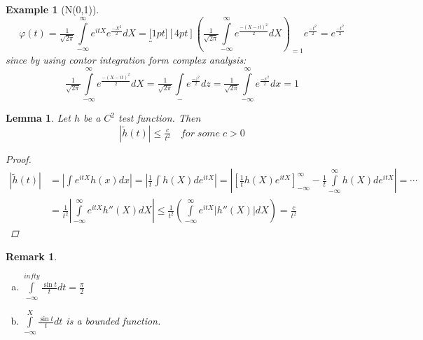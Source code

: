 \documentclass[12pt]{article}
\newtheorem{lemma}[theorem]{Lemma}
\newtheorem{example}{Example}[section]
\newtheorem*{remark}{Remark}
\begin{document}
\begin{example}[N(0,1)]
\[\varphi(t) = \tfrac{1}{\sqrt{2\pi}}\int\limits_{-\infty}^{\infty}e^{itX}e^{\tfrac{-X^2}{2}}dX = \underbracket[1pt][4pt]{\left(\tfrac{1}{\sqrt{2\pi}}\int\limits_{-\infty}^{\infty}e^{\frac{-(X-it)^2}{2}}dX\right)}_{=1}e^{\frac{-t^2}{2}} = e^{\frac{-t^2}{2}}\]
since by using contor integration form complex analysis:
\[\tfrac{1}{\sqrt{2\pi}}\int\limits_{-\infty}^{\infty}e^{\frac{-(X-it)^2}{2}}dX = \tfrac{1}{\sqrt{2\pi}}\int\limits_{-}e^{\frac{-z^2}{2}}dz = \tfrac{1}{\sqrt{2\pi}}\int\limits_{-\infty}^{\infty}e^{\frac{-x^2}{2}}dx =1\]
\end{example}

\begin{lemma}
Let $h$ be a $C^2$ test function. Then
\[|\tilde{h}(t)| \leq \tfrac{c}{t^2} \quad for\; some\; c>0\]
\begin{proof}
\begin{align*}
|\tilde{h}(t)| &= \left|\int e^{itX}h(x)dx \right| = \left|\tfrac{1}{t}\int h(X)de^{itX}\right| = \left|\left[\tfrac{1}{t} h(X)e^{itX}\right]_{-\infty}^{\infty} - \tfrac{1}{t}\int\limits_{-\infty}^{\infty} h(X)de^{itX}\right|= \cdots \\ 
&=\tfrac{1}{t^2}\left|\int\limits_{-\infty}^{\infty}e^{itX} h''(X)dX\right| \leq  \tfrac{1}{t^2}\left(\int\limits_{-\infty}^{\infty}e^{itX}\left| h''(X)\right|dX\right) = \frac{c}{t^2} \end{align*}
\end{proof}
\end{lemma}

\begin{remark}\quad \\
\begin{enumerate}[(a)]
\item $\int\limits_{-\infty}^{infty} \frac{\sin t}{t} dt = \tfrac{\pi}{2}$
\item $\int\limits_{-\infty}^{X} \frac{\sin t}{t} dt$ is a bounded function.
\end{enumerate}
\end{remark}
\end{document}
